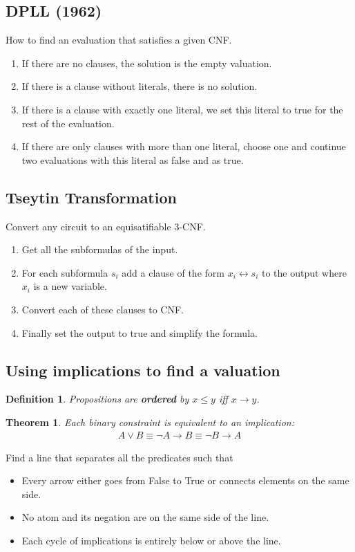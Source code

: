 \documentclass{article}
\theoremstyle{sltheorem}
\newtheorem{definition}{Definition}
\newtheorem{theorem}{Theorem}
\begin{document}
\subsection{DPLL (1962)}
How to find an evaluation that satisfies a given CNF.
\begin{enumerate}
	\item If there are no clauses, the solution is the empty valuation.
	\item If there is a clause without literals, there is no solution.
	\item If there is a clause with exactly one literal, we set this literal to true for the rest of the evaluation.
	\item If there are only clauses with more than one literal, choose one and continue two evaluations with this literal as false and as true.
\end{enumerate}
\subsection{Tseytin Transformation}
Convert any circuit to an equisatifiable 3-CNF.
\begin{enumerate}
	\item Get all the subformulas of the input.
	\item For each subformula $s_i$ add a clause of the form $x_i \leftrightarrow s_i$ to the output where $x_i$ is a new variable.
	\item Convert each of these clauses to CNF.
	\item Finally set the output to true and simplify the formula.
\end{enumerate}
\subsection{Using implications to find a valuation}
\begin{definition}
	Propositions are \textbf{ordered} by $x\leq y$ iff $x\to y$.
\end{definition}
\begin{theorem}
	Each binary constraint is equivalent to an implication:
	\begin{align*}
		A \vee B \equiv \neg A \to B \equiv \neg B \to A
	\end{align*}
\end{theorem}
\noindent Find a line that separates all the predicates such that
\begin{itemize}
	\item Every arrow either goes from False to True or connects elements on the same side.
	\item No atom and its negation are on the same side of the line.
	\item Each cycle of implications is entirely below or above the line.
\end{itemize}
\end{document}
